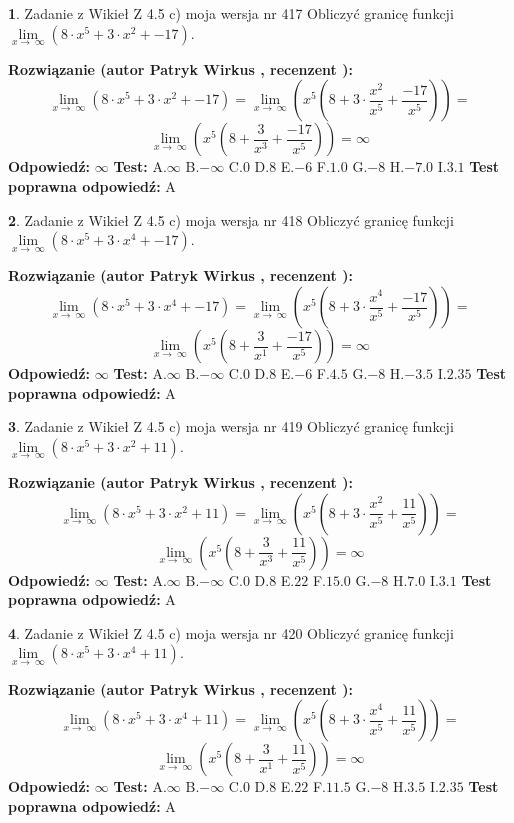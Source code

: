 \documentclass[12pt, a4paper]{article}
\theoremstyle{definition} %
\newtheorem{zad}{}
\newcommand{\zadStart}[1]{\begin{zad}#1\newline}
\newcommand{\zadStop}{\end{zad}}
\newcommand{\rozwStart}[2]{\noindent \textbf{Rozwiązanie (autor #1 , recenzent #2): }\newline}
\newcommand{\rozwStop}{\newline}
\newcommand{\odpStart}{\noindent \textbf{Odpowiedź:}\newline}
\newcommand{\odpStop}{\newline}
\newcommand{\testStart}{\noindent \textbf{Test:}\newline}
\newcommand{\testStop}{\newline}
\newcommand{\kluczStart}{\noindent \textbf{Test poprawna odpowiedź:}\newline}
\newcommand{\kluczStop}{\newline}
\begin{document}
\zadStart{Zadanie z Wikieł Z 4.5 c) moja wersja nr 417}
Obliczyć granicę funkcji  $\lim\limits_{x\to\ \infty}(8 \cdot x^{5}+3 \cdot x^{2}+-17)$.
\zadStop
\rozwStart{Patryk Wirkus}{}
$$\lim\limits_{x\to\ \infty}(8 \cdot x^{5}+3 \cdot x^{2}+-17) = \lim\limits_{x\to\ \infty}(x^{5}(8 +3 \cdot \frac{x^{2}}{x^{5}}+\frac{-17}{x^{5}})) =$$ $$\lim\limits_{x\to\ \infty}(x^{5}(8 +\frac{3}{x^{3}}+\frac{-17}{x^{5}})) =\infty$$
\rozwStop
\odpStart
$\infty$
\odpStop
\testStart
A.$\infty$ B.$-\infty$ C.$0$ D.$8$ E.$-6$
F.$1.0$ G.$-8$
H.$-7.0$
I.$3.1$
\testStop
\kluczStart
A
\kluczStop



\zadStart{Zadanie z Wikieł Z 4.5 c) moja wersja nr 418}
Obliczyć granicę funkcji  $\lim\limits_{x\to\ \infty}(8 \cdot x^{5}+3 \cdot x^{4}+-17)$.
\zadStop
\rozwStart{Patryk Wirkus}{}
$$\lim\limits_{x\to\ \infty}(8 \cdot x^{5}+3 \cdot x^{4}+-17) = \lim\limits_{x\to\ \infty}(x^{5}(8 +3 \cdot \frac{x^{4}}{x^{5}}+\frac{-17}{x^{5}})) =$$ $$\lim\limits_{x\to\ \infty}(x^{5}(8 +\frac{3}{x^{1}}+\frac{-17}{x^{5}})) =\infty$$
\rozwStop
\odpStart
$\infty$
\odpStop
\testStart
A.$\infty$ B.$-\infty$ C.$0$ D.$8$ E.$-6$
F.$4.5$ G.$-8$
H.$-3.5$
I.$2.35$
\testStop
\kluczStart
A
\kluczStop



\zadStart{Zadanie z Wikieł Z 4.5 c) moja wersja nr 419}
Obliczyć granicę funkcji  $\lim\limits_{x\to\ \infty}(8 \cdot x^{5}+3 \cdot x^{2}+11)$.
\zadStop
\rozwStart{Patryk Wirkus}{}
$$\lim\limits_{x\to\ \infty}(8 \cdot x^{5}+3 \cdot x^{2}+11) = \lim\limits_{x\to\ \infty}(x^{5}(8 +3 \cdot \frac{x^{2}}{x^{5}}+\frac{11}{x^{5}})) =$$ $$\lim\limits_{x\to\ \infty}(x^{5}(8 +\frac{3}{x^{3}}+\frac{11}{x^{5}})) =\infty$$
\rozwStop
\odpStart
$\infty$
\odpStop
\testStart
A.$\infty$ B.$-\infty$ C.$0$ D.$8$ E.$22$
F.$15.0$ G.$-8$
H.$7.0$
I.$3.1$
\testStop
\kluczStart
A
\kluczStop



\zadStart{Zadanie z Wikieł Z 4.5 c) moja wersja nr 420}
Obliczyć granicę funkcji  $\lim\limits_{x\to\ \infty}(8 \cdot x^{5}+3 \cdot x^{4}+11)$.
\zadStop
\rozwStart{Patryk Wirkus}{}
$$\lim\limits_{x\to\ \infty}(8 \cdot x^{5}+3 \cdot x^{4}+11) = \lim\limits_{x\to\ \infty}(x^{5}(8 +3 \cdot \frac{x^{4}}{x^{5}}+\frac{11}{x^{5}})) =$$ $$\lim\limits_{x\to\ \infty}(x^{5}(8 +\frac{3}{x^{1}}+\frac{11}{x^{5}})) =\infty$$
\rozwStop
\odpStart
$\infty$
\odpStop
\testStart
A.$\infty$ B.$-\infty$ C.$0$ D.$8$ E.$22$
F.$11.5$ G.$-8$
H.$3.5$
I.$2.35$
\testStop
\kluczStart
A
\kluczStop
\end{document}
